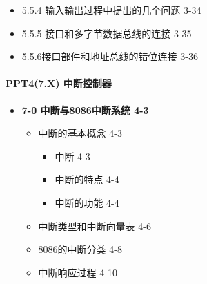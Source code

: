 \documentclass[zihao=5,linespread=1,heading=false,autoindent=0pt]{ctexart}
\newenvironment{citemize}%
{\begin{itemize}[parsep=0pt,itemsep=0pt,topsep=0pt,partopsep=0pt,labelwidth=1em,leftmargin=*]}
{\end{itemize}}
\theoremstyle{exampstyle} \newtheorem{definition}{定义}[section]
\theoremstyle{exampstyle} \newtheorem{example}{例}[section]
\theoremstyle{exampstyle} \newtheorem{theorem}{定理}[section]
\theoremstyle{exampstyle} \newtheorem{lemma}{引理}[section]
\theoremstyle{exampstyle} \newtheorem{myproof}{证明}[section]
\begin{document}
\begin{multicols*}{3}
\begin{citemize}
\begin{citemize}
\begin{citemize}
        \item
          DMA传送方式的提出 3-26
        \item
          DMA控制器的功能和DMA传送原理 3-27
        \item
          DMA控制器的内部最小配置和接口要求 3-28
        \item
          对DMA传送对I/O接口的要求 3-30
        \item
          对DMA控制器的要求 3-30
        \item
          系统对DMA控制器和接口部件预置信息 3-31
        \item
          启动数据块输入的程序段 3-32
        \item
          DMA控制器的工作特点 3-33
        \end{citemize}
      \item
        5.5.4 输入输出过程中提出的几个问题 3-34
      \item
        5.5.5 接口和多字节数据总线的连接 3-35
      \item
        5.5.6接口部件和地址总线的错位连接 3-36
      \end{citemize}
    \end{citemize}
    
    \hypertarget{ppt47.x-ux4e2dux65adux63a7ux5236ux5668}{%
    \paragraph{PPT4(7.X)
    中断控制器}\label{ppt47.x-ux4e2dux65adux63a7ux5236ux5668}}
    
    \begin{citemize}
     
    \item
      \textbf{7-0 中断与8086中断系统 4-3}
    
      \begin{citemize}
       
      \item
        中断的基本概念 4-3
    
        \begin{citemize}
         
        \item
          中断 4-3
        \item
          中断的特点 4-4
        \item
          中断的功能 4-4
        \end{citemize}
      \item
        中断类型和中断向量表 4-6
      \item
        8086的中断分类 4-8
      \item
        中断响应过程 4-10
      \end{citemize}
    \end{citemize}
    

\end{multicols*}
\end{document}

